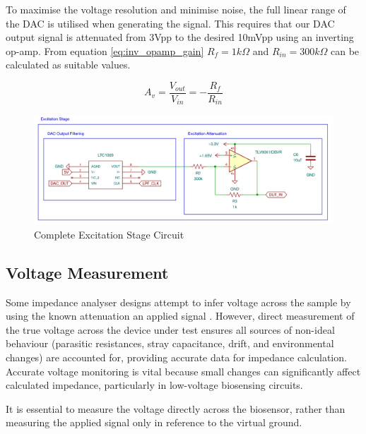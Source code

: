 To maximise the voltage resolution and minimise noise, the full linear range of the DAC is utilised when generating the signal. This requires that our DAC output signal is attenuated from 3Vpp to the desired 10mVpp using an inverting op-amp. From equation \ref{eq:inv_opamp_gain} $R_{f}=1k\Omega$ and $R_{in}=300k\Omega$ can be calculated as suitable values.

\begin{equation}
    A_v = \frac{V_{out}}{V_{in}} = -\frac{R_f}{R_{in}}
    \label{eq:inv_opamp_gain}
\end{equation}


\begin{figure}[]
    \centering
    \includegraphics[width=\textwidth]{ExcitationSchem.png}
    \caption{Complete Excitation Stage Circuit}
    \label{fig:excitation_stage_circuit}
\end{figure}

\subsection{Voltage Measurement}
Some impedance analyser designs attempt to infer voltage across the sample by using the known attenuation an applied signal \cite{buscagliaSimpleZLowCostPortable2023}. However, direct measurement of the true voltage across the device under test ensures all sources of non-ideal behaviour (parasitic resistances, stray capacitance, drift, and environmental changes) are accounted for, providing accurate data for impedance calculation. Accurate voltage monitoring is vital because small changes can significantly affect calculated impedance, particularly in low-voltage biosensing circuits.

It is essential to measure the voltage directly across the biosensor, rather than measuring the applied signal only in reference to the virtual ground.  

